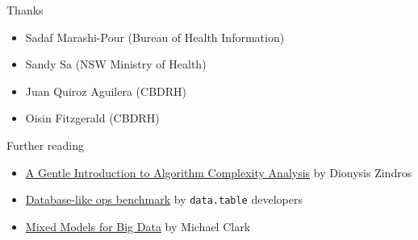 \documentclass[aspectratio=169,12pt,usepdftitle=false]{beamer} %
\begin{document}



\begin{frame}{Thanks}
    \begin{itemize}
        \item Sadaf Marashi-Pour (Bureau of Health Information)
	\item Sandy Sa (NSW Ministry of Health)
	\item Juan Quiroz Aguilera (CBDRH)
	\item Oisin Fitzgerald (CBDRH)
    \end{itemize}
\end{frame}

\begin{frame}{Further reading}
    \begin{itemize}
	\item \href{https://discrete.gr/complexity/}{A Gentle Introduction to Algorithm Complexity Analysis} by Dionysis Zindros
	\item \href{https://h2oai.github.io/db-benchmark/}{Database-like ops benchmark} by \texttt{data.table} developers
	\item \href{https://m-clark.github.io/posts/2019-10-20-big-mixed-models/}{Mixed Models for Big Data} by Michael Clark
    \end{itemize}
\end{frame}

{
\begin{frame}[plain]
\end{frame}
}
\end{document}
